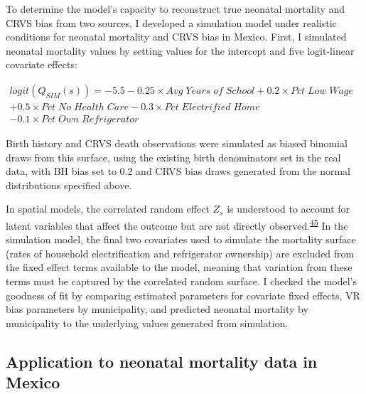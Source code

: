 \documentclass[
]{article}
\begin{document}
To determine the model's capacity to reconstruct true neonatal mortality and CRVS bias from two sources, I developed a simulation model under realistic conditions for neonatal mortality and CRVS bias in Mexico. First, I simulated neonatal mortality values by setting values for the intercept and five logit-linear covariate effects:

\begin{math}\begin{aligned}
logit(Q_{SIM}(s)) = -5.5 -0.25 \times Avg\;Years\;of\;School + 0.2 \times Pct\;Low\;Wage\\
+ 0.5 \times Pct\;No\;Health\;Care-0.3 \times Pct\;Electrified\;Home
\\- 0.1 \times Pct\;Own\;Refrigerator\;\;\;\;\;\;\;\;\;\;\;\;\;\;\;\;\;\;\;\;\;\;\;\;\;\;\;\;\;\;\;\;\;\;\;\;\;\;\;\;\;\;\;\;\;\;
\end{aligned}\end{math}

Birth history and CRVS death observations were simulated as biased binomial draws from this surface, using the existing birth denominators set in the real data, with BH bias set to 0.2 and CRVS bias draws generated from the normal distributions specified above.

In spatial models, the correlated random effect \(Z_s\) is understood to account for latent variables that affect the outcome but are not directly observed.\textsuperscript{\protect\hyperlink{ref-Divino2009}{45}} In the simulation model, the final two covariates used to simulate the mortality surface (rates of household electrification and refrigerator ownership) are excluded from the fixed effect terms available to the model, meaning that variation from these terms must be captured by the correlated random surface. I checked the model's goodness of fit by comparing estimated parameters for covariate fixed effects, VR bias parameters by municipality, and predicted neonatal mortality by municipality to the underlying values generated from simulation.

\hypertarget{application-to-neonatal-mortality-data-in-mexico}{%
\subsection{Application to neonatal mortality data in Mexico}\label{application-to-neonatal-mortality-data-in-mexico}}
\end{document}

